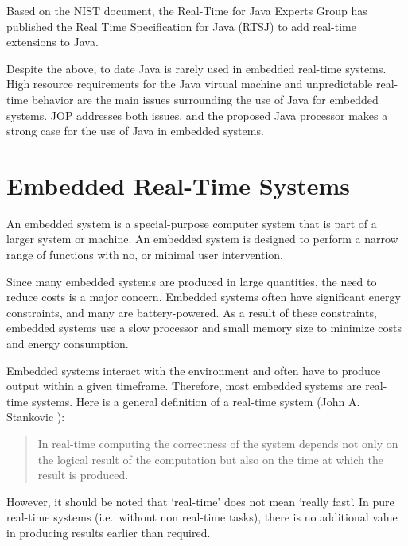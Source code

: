 Based on the NIST document, the Real-Time for Java Experts Group has
published the Real Time Specification for Java (RTSJ) \cite{rtsj} to
add real-time extensions to Java.

Despite the above, to date Java is rarely used in embedded real-time
systems. High resource requirements for the Java virtual machine and
unpredictable real-time behavior are the main issues surrounding the
use of Java for embedded systems. JOP addresses both issues, and the
proposed Java processor makes a strong case for the use of Java in
embedded systems.

\section{Embedded Real-Time Systems}

An embedded system is a special-purpose computer system that is part
of a larger system or machine. An embedded system is designed to
perform a narrow range of functions with no, or minimal user
intervention.

Since many embedded systems are produced in large quantities, the
need to reduce costs is a major concern. Embedded systems often have
significant energy constraints, and many are battery-powered. As a
result of these constraints, embedded systems use a slow processor
and small memory size to minimize costs and energy consumption.

Embedded systems interact with the environment and often have to
produce output within a given timeframe. Therefore, most embedded
systems are real-time systems. Here is a general definition of a
real-time system (John A. Stankovic \cite{50811}):

\begin{quote}
In real-time computing the correctness of the system depends not
only on the logical result of the computation but also on the time
at which the result is produced.
\end{quote}

%
However, it should be noted that `real-time' does not mean `really
fast'. In pure real-time systems (i.e.\ without non real-time
tasks), there is no additional value in producing results earlier
than required.

